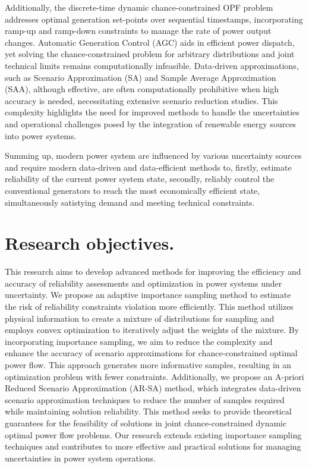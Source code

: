 Additionally, the discrete-time dynamic chance-constrained OPF problem addresses optimal generation set-points over sequential timestamps, incorporating ramp-up and ramp-down constraints to manage the rate of power output changes. Automatic Generation Control (AGC) aids in efficient power dispatch, yet solving the chance-constrained problem for arbitrary distributions and joint technical limits remains computationally infeasible. Data-driven approximations, such as Scenario Approximation (SA) and Sample Average Approximation (SAA), although effective, are often computationally prohibitive when high accuracy is needed, necessitating extensive scenario reduction studies. This complexity highlights the need for improved methods to handle the uncertainties and operational challenges posed by the integration of renewable energy sources into power systems.

Summing up, modern power system are influenced by various uncertainty sources and require modern data-driven and data-efficient methods to, firstly, estimate reliability of the current power system state, secondly, reliably control the conventional generators to reach the most economically efficient state, simultaneously satistying demand and meeting technical constraints.

\section{Research objectives.}

This research aims to develop advanced methods for improving the efficiency and accuracy of reliability assessments and optimization in power systems under uncertainty. We propose an adaptive importance sampling method to estimate the risk of reliability constraints violation more efficiently. This method utilizes physical information to create a mixture of distributions for sampling and employs convex optimization to iteratively adjust the weights of the mixture. By incorporating importance sampling, we aim to reduce the complexity and enhance the accuracy of scenario approximations for chance-constrained optimal power flow. This approach generates more informative samples, resulting in an optimization problem with fewer constraints. Additionally, we propose an A-priori Reduced Scenario Approximation (AR-SA) method, which integrates data-driven scenario approximation techniques to reduce the number of samples required while maintaining solution reliability. This method seeks to provide theoretical guarantees for the feasibility of solutions in joint chance-constrained dynamic optimal power flow problems. Our research extends existing importance sampling techniques and contributes to more effective and practical solutions for managing uncertainties in power system operations.

